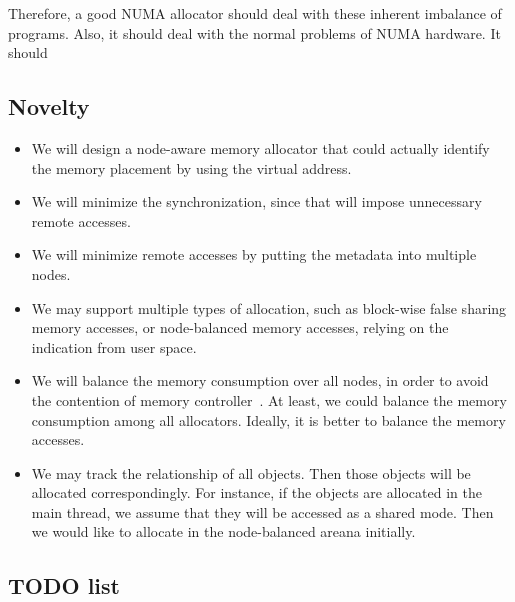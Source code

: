 Therefore, a good NUMA allocator should deal with these inherent imbalance of programs. Also, it should deal with the normal problems of NUMA hardware. It should 

\subsection{Novelty}

\begin{itemize}
\item We will design a node-aware memory allocator that could actually identify the memory placement by using the virtual address.
\item We will minimize the synchronization, since that will impose unnecessary remote accesses. 
\item We will minimize remote accesses by putting the metadata into multiple nodes. 
\item We may support multiple types of allocation, such as block-wise false sharing memory accesses, or node-balanced memory accesses, relying on the indication from user space. 	
\item We will balance the memory consumption over all nodes, in order to avoid the contention of memory controller~\cite{Majo:2011:MSP:1987816.1987832}.  At least, we could balance the memory consumption among all allocators. Ideally, it is better to balance the memory accesses. 
\item We may track the relationship of all objects. Then those objects will be allocated correspondingly. For instance, if the objects are allocated in the main thread, we assume that they will be accessed as a shared mode. Then we would like to allocate in the node-balanced areana initially. 

\end{itemize}


\subsection{TODO list}

